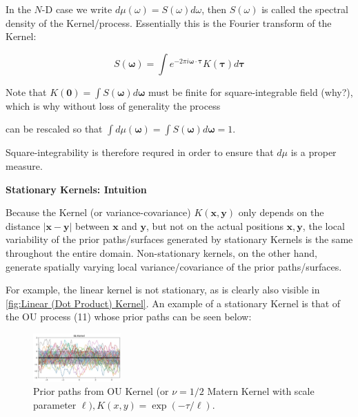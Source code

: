 \documentclass[11pt]{article}
\theoremstyle{plain} %
\theoremstyle{remark}
\begin{document}
In the $N$-D case we write $d \mu(\omega)=S(\omega) d \omega$, then $S(\omega)$
is called the spectral density of the Kernel/process. Essentially this is the
Fourier transform of the Kernel:

$$
  S(\boldsymbol{\omega})=\int e^{-2 \pi i \boldsymbol{\omega} \cdot \boldsymbol{\tau}} K(\boldsymbol{\tau}) d \boldsymbol{\tau}
$$

Note that $K(\mathbf{0})=\int S(\boldsymbol{\omega}) d \boldsymbol{\omega}$ must
be finite for square-integrable field (why?), which is why without loss of
generality the process

can be rescaled so that $\int d \mu(\boldsymbol{\omega})=\int
  S(\boldsymbol{\omega}) d \boldsymbol{\omega}=1$.

Square-integrability is therefore requred in order to ensure that $d \mu$ is a
proper measure.

\textbf{Stationary Kernels: Intuition}

Because the Kernel (or variance-covariance) $K(\mathbf{x}, \mathbf{y})$ only
depends on the distance $|\mathbf{x}-\mathbf{y}|$ between $\mathbf{x}$ and
$\mathbf{y}$, but not on the actual positions $\mathbf{x}, \mathbf{y}$, the
local variability of the prior paths/surfaces generated by stationary Kernels is
the same throughout the entire domain. Non-stationary kernels, on the other
hand, generate spatially varying local variance/covariance of the prior
paths/surfaces.

For example, the linear kernel is not stationary, as is clearly also visible in
\cref{fig:Linear (Dot Product) Kernel}. An example of a stationary Kernel is that of the OU process (11) whose prior
paths can be seen below:

\begin{figure}[!htp]
  \centering
  \includegraphics[width=0.3\textwidth]{images/2023_11_26_5b299dbd302e8f129737g-55}
  \caption{Prior paths from OU Kernel (or $\nu=1 / 2$ Matern Kernel with scale
    parameter $\ell), K(x, y)=\exp (-\tau / \ell)$.}
  \label{fig:stationary Matern kernel}
\end{figure}
\end{document}
